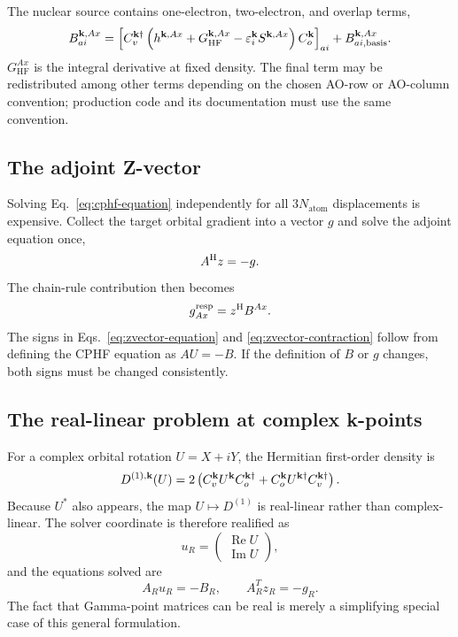 The nuclear source contains one-electron, two-electron, and overlap terms,
\begin{equation}
  B_{ai}^{\mathbf{k},Ax}
  =\left[C_v^{\mathbf{k}\dagger}
    \left(h^{\mathbf{k},Ax}+G_{\mathrm{HF}}^{\mathbf{k},Ax}
          -\varepsilon_i^{\mathbf{k}}S^{\mathbf{k},Ax}\right)
    C_o^{\mathbf{k}}\right]_{ai}
  +B_{ai,\mathrm{basis}}^{\mathbf{k},Ax}.
  \label{eq:cphf-source}
\end{equation}
$G_{\mathrm{HF}}^{Ax}$ is the integral derivative at fixed density.  The final
term may be redistributed among other terms depending on the chosen AO-row or
AO-column convention; production code and its documentation must use the same
convention.

\subsection{The adjoint Z-vector}

Solving Eq.~\eqref{eq:cphf-equation} independently for all
$3N_{\mathrm{atom}}$ displacements is expensive.  Collect the target orbital
gradient into a vector $g$ and solve the adjoint equation once,
\begin{equation}
  A^{\mathrm{H}}z=-g.
  \label{eq:zvector-equation}
\end{equation}
The chain-rule contribution then becomes
\begin{equation}
  g_{Ax}^{\mathrm{resp}}
  =z^{\mathrm{H}}B^{Ax}.
  \label{eq:zvector-contraction}
\end{equation}
The signs in Eqs.~\eqref{eq:zvector-equation} and
\eqref{eq:zvector-contraction} follow from defining the CPHF equation as
$AU=-B$.  If the definition of $B$ or $g$ changes, both signs must be changed
consistently.

\subsection{The real-linear problem at complex k-points}

For a complex orbital rotation $U=X+iY$, the Hermitian first-order density is
\begin{equation}
  D^{(1),\mathbf{k}}(U)
  =2\left(C_v^{\mathbf{k}}U^{\mathbf{k}}C_o^{\mathbf{k}\dagger}
          +C_o^{\mathbf{k}}U^{\mathbf{k}\dagger}C_v^{\mathbf{k}\dagger}\right).
  \label{eq:first-order-density}
\end{equation}
Because $U^*$ also appears, the map $U\mapsto D^{(1)}$ is real-linear rather
than complex-linear.  The solver coordinate is therefore realified as
\begin{equation}
  u_R=\begin{pmatrix}\operatorname{Re}U\\\operatorname{Im}U\end{pmatrix},
  \label{eq:realified-coordinate}
\end{equation}
and the equations solved are
\begin{equation}
  A_Ru_R=-B_R,
  \qquad A_R^Tz_R=-g_R.
  \label{eq:realified-zvector}
\end{equation}
The fact that Gamma-point matrices can be real is merely a simplifying special
case of this general formulation.

